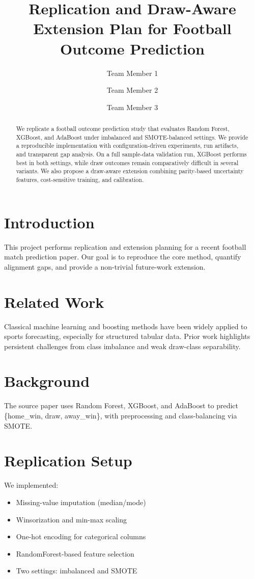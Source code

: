 \documentclass[11pt]{article}
\title{Replication and Draw-Aware Extension Plan for Football Outcome Prediction}
\author{Team Member 1 \and Team Member 2 \and Team Member 3}
\date{}
\begin{document}
\maketitle

\begin{abstract}
We replicate a football outcome prediction study that evaluates Random Forest, XGBoost, and AdaBoost under imbalanced and SMOTE-balanced settings. We provide a reproducible implementation with configuration-driven experiments, run artifacts, and transparent gap analysis. On a full sample-data validation run, XGBoost performs best in both settings, while draw outcomes remain comparatively difficult in several variants. We also propose a draw-aware extension combining parity-based uncertainty features, cost-sensitive training, and calibration.
\end{abstract}

\section{Introduction}
This project performs replication and extension planning for a recent football match prediction paper. Our goal is to reproduce the core method, quantify alignment gaps, and provide a non-trivial future-work extension.

\section{Related Work}
Classical machine learning and boosting methods have been widely applied to sports forecasting, especially for structured tabular data. Prior work highlights persistent challenges from class imbalance and weak draw-class separability.

\section{Background}
The source paper uses Random Forest, XGBoost, and AdaBoost to predict \{home\_win, draw, away\_win\}, with preprocessing and class-balancing via SMOTE.

\section{Replication Setup}
We implemented:
\begin{itemize}
  \item Missing-value imputation (median/mode)
  \item Winsorization and min-max scaling
  \item One-hot encoding for categorical columns
  \item RandomForest-based feature selection
  \item Two settings: imbalanced and SMOTE
\end{itemize}
\end{document}
